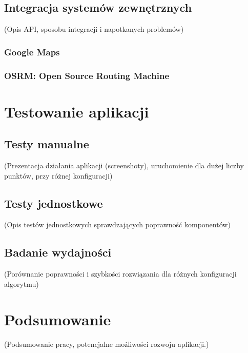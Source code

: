 \documentclass[12pt,a4paper]{report}
\begin{document}
		\section{Integracja systemów zewnętrznych}
			(Opis API, sposobu integracji i napotkanych problemów)
			\subsection{Google Maps}
			\subsection{OSRM: Open Source Routing Machine}
	\chapter{Testowanie aplikacji}
	\section{Testy manualne}
	(Prezentacja działania aplikacji (screenshoty), uruchomienie dla dużej liczby punktów, przy różnej konfiguracji)
	\section{Testy jednostkowe}
	\label{sec:testy_jednostkowe}
	(Opis testów jednostkowych sprawdzających poprawność komponentów)
	\section{Badanie wydajności}
	(Porównanie poprawności i szybkości rozwiązania dla różnych konfiguracji algorytmu)
	
	\chapter*{Podsumowanie}
		(Podsumowanie pracy, potencjalne możliwości rozwoju aplikacji.)
		
	
	
\end{document}
